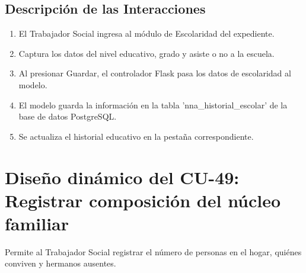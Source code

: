 \subsection{Descripción de las Interacciones}
\begin{enumerate}
    \item El Trabajador Social ingresa al módulo de Escolaridad del expediente.
    \item Captura los datos del nivel educativo, grado y asiste o no a la escuela.
    \item Al presionar Guardar, el controlador Flask pasa los datos de escolaridad al modelo.
    \item El modelo guarda la información en la tabla 'nna\_historial\_escolar' de la base de datos PostgreSQL.
    \item Se actualiza el historial educativo en la pestaña correspondiente.
\end{enumerate}

\cleardoublepage
\section{Diseño dinámico del CU-49: Registrar composición del núcleo familiar}
\label{sec:disenoDinamicoCU49}

Permite al Trabajador Social registrar el número de personas en el hogar, quiénes conviven y hermanos ausentes.

